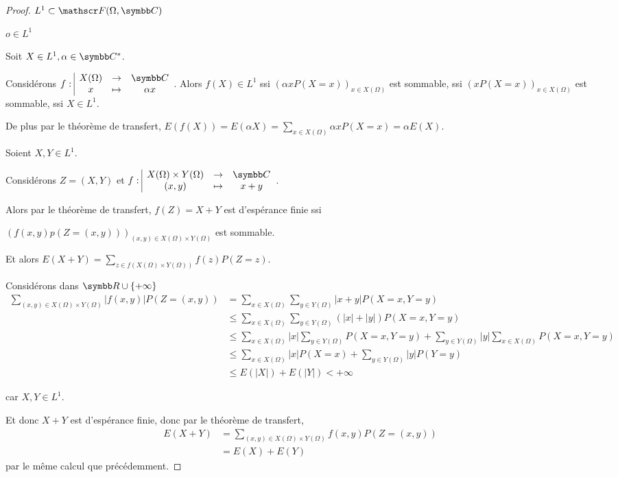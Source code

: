 \begin{proof}
    $L^1 \subset \mathscr F(\Omega, \C)$

    $o \in L^1$

    Soit $X \in L^1, \alpha \in \C^*$. 

    Considérons $\fonction{f}{X(\Omega)}{\C}{x}{\alpha x}$.
    Alors $f(X) \in L^1$ ssi $(\alpha x P(X = x))_{x \in X(\Omega)}$ est sommable,
    ssi $(x P(X = x))_{x \in X(\Omega)}$ est sommable, ssi $X \in L^1$.

    De plus par le théorème de transfert, 
    $E(f(X)) = E(\alpha X) = \sum_{x \in X(\Omega)} \alpha x P(X = x) = \alpha E(X)$.

    \lvspace Soient $X, Y \in L^1$.

    Considérons $Z = (X, Y)$ et $\fonction{f}{X(\Omega) \times Y(\Omega)}{\C}{(x, y)}{x + y}$.

    Alors par le théorème de transfert, $f(Z) = X + Y$ est d'espérance finie ssi

    $(f(x, y) p(Z = (x, y)))_{(x, y) \in X(\Omega) \times Y(\Omega)}$ est sommable.

    Et alors $\displaystyle E(X + Y) = \sum_{z \in f(X(\Omega) \times Y(\Omega))} f(z) P(Z = z)$.

    Considérons dans $\R \cup \{+ \infty \}$ 
    \begin{align}
        \sum_{(x, y) \in X(\Omega) \times Y(\Omega)} |f(x, y)| P(Z = (x, y)) & = \sum_{x \in X(\Omega)} \sum_{y \in Y(\Omega)} |x + y| P(X = x, Y = y) \\
        & \leqslant \sum_{x \in X(\Omega)} \sum_{y \in Y(\Omega)} (|x| + |y|) P(X = x, Y = y) \\
        & \leqslant \sum_{x \in X(\Omega)} |x| \sum_{y \in Y(\Omega)} P(X = x, Y = y) + \sum_{y \in Y(\Omega)} |y| \sum_{x \in X(\Omega)} P(X = x, Y = y) \\
        & \leqslant \sum_{x \in X(\Omega)} |x| P(X = x) + \sum_{y \in Y(\Omega)} |y| P(Y = y) \\
        & \leqslant E(|X|) + E(|Y|) < + \infty
    \end{align}

    car $X, Y \in L^1$.

    Et donc $X + Y$ est d'espérance finie, donc par le théorème de transfert, 
    \begin{align}
        E(X + Y) & = \sum_{(x, y) \in X(\Omega) \times Y(\Omega)} f(x, y) P(Z = (x, y)) \\
        & = E(X) + E(Y)
    \end{align}
    par le même calcul que précédemment.
\end{proof}



